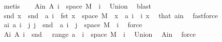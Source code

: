 \begin{isabellebody}
\ metis\isanewline
\ \ \isamarkupfalse%
\ A{\isacharunderscore}{\kern0pt}in{\isacharcolon}{\kern0pt}\ {\isachardoublequoteopen}A\ i\ {\isasymsubseteq}\ space\ M{\isachardoublequoteclose}\ \ i\ \isamarkupfalse%
\ Union{\isacharparenleft}{\kern0pt}{}{\isacharparenright}{\kern0pt}\ \isamarkupfalse%
\ blast\isanewline
\ \ \isamarkupfalse%
\ {\isachardoublequoteopen}snd\ x\ {\isasymin}\ snd\ {\isacharbackquote}{\kern0pt}\ {\isacharparenleft}{\kern0pt}a\ i\ {\isasyminter}\ {\isacharparenleft}{\kern0pt}{\isacharbraceleft}{\kern0pt}fst\ x{\isacharbraceright}{\kern0pt}\ {\isasymtimes}\ space\ M{\isacharparenright}{\kern0pt}{\isacharparenright}{\kern0pt}{\isachardoublequoteclose}\ \ {\isachardoublequoteopen}x\ {\isasymin}\ a\ i{\isachardoublequoteclose}\ \ i\ x\ \isamarkupfalse%
\ that\ a{\isacharunderscore}{\kern0pt}in\ \isamarkupfalse%
\ fastforce\isanewline
\ \ \isamarkupfalse%
\ a{\isacharunderscore}{\kern0pt}i{\isacharcolon}{\kern0pt}\ {\isachardoublequoteopen}a\ i\ {\isacharequal}{\kern0pt}\ {\isacharparenleft}{\kern0pt}{\isasymUnion}j{\isachardot}{\kern0pt}\ {\isacharbraceleft}{\kern0pt}j{\isacharbraceright}{\kern0pt}\ {\isasymtimes}\ {\isacharparenleft}{\kern0pt}snd\ {\isacharbackquote}{\kern0pt}\ {\isacharparenleft}{\kern0pt}a\ i\ {\isasyminter}\ {\isacharparenleft}{\kern0pt}{\isacharbraceleft}{\kern0pt}j{\isacharbraceright}{\kern0pt}\ {\isasymtimes}\ space\ M{\isacharparenright}{\kern0pt}{\isacharparenright}{\kern0pt}{\isacharparenright}{\kern0pt}{\isacharparenright}{\kern0pt}{\isachardoublequoteclose}\ \ i\ \isamarkupfalse%
\ force\isanewline
\ \ \isamarkupfalse%
\ A{\isacharunderscore}{\kern0pt}i{\isacharcolon}{\kern0pt}\ {\isachardoublequoteopen}A\ i\ {\isacharequal}{\kern0pt}\ snd\ {\isacharbackquote}{\kern0pt}\ {\isacharparenleft}{\kern0pt}{\isasymUnion}\ {\isacharparenleft}{\kern0pt}range\ a{\isacharparenright}{\kern0pt}\ {\isasyminter}\ {\isacharparenleft}{\kern0pt}{\isacharbraceleft}{\kern0pt}i{\isacharbraceright}{\kern0pt}\ {\isasymtimes}\ space\ M{\isacharparenright}{\kern0pt}{\isacharparenright}{\kern0pt}{\isachardoublequoteclose}\ \ i\ \isamarkupfalse%
\ Union{\isacharparenleft}{\kern0pt}{}{\isacharparenright}{\kern0pt}\ \isamarkupfalse%
\ A{\isacharunderscore}{\kern0pt}in\ \isamarkupfalse%
\ force\ \isanewline
\ \ \isamarkupfalse%

\end{isabellebody}
